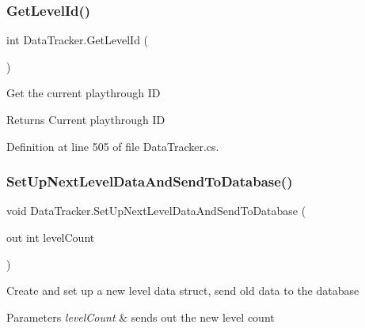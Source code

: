 \mbox{\label{class_data_tracker_ac408fabd7e0e96255508610fb66a18f2}} 
\subsubsection{\texorpdfstring{Get\+Level\+Id()}{GetLevelId()}}
{\footnotesize\ttfamily int Data\+Tracker.\+Get\+Level\+Id (\begin{DoxyParamCaption}{ }\end{DoxyParamCaption})}



Get the current playthrough ID 

\begin{DoxyReturn}{Returns}
Current playthrough ID
\end{DoxyReturn}


Definition at line 505 of file Data\+Tracker.\+cs.

\mbox{\label{class_data_tracker_af9257217e007188c0437f1d446542942}} 
\subsubsection{\texorpdfstring{Set\+Up\+Next\+Level\+Data\+And\+Send\+To\+Database()}{SetUpNextLevelDataAndSendToDatabase()}}
{\footnotesize\ttfamily void Data\+Tracker.\+Set\+Up\+Next\+Level\+Data\+And\+Send\+To\+Database (\begin{DoxyParamCaption}\item[{out int}]{level\+Count }\end{DoxyParamCaption})}



Create and set up a new level data struct, send old data to the database 


\begin{DoxyParams}{Parameters}
{\em level\+Count} & sends out the new level count\\
\hline
\end{DoxyParams}


